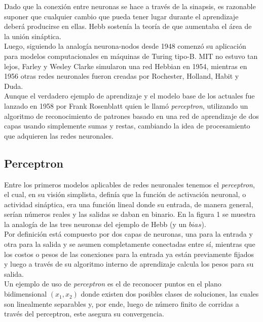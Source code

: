 \documentclass{llncs}
\begin{document}
Dado que la conexi\'on entre neuronas se hace a trav\'es de la sinapsis, es razonable suponer que cualquier cambio que pueda tener
lugar durante el aprendizaje deber\'a producirse en ellas. Hebb sosten\'ia la teor\'ia de que aumentaba el \'area de la uni\'on sin\'aptica.\\

Luego, siguiendo la analog\'ia neurona-nodos desde 1948 comenz\'o su aplicaci\'on para modelos
computacionales en m\'aquinas de Turing tipo-B. MIT no estuvo tan lejos, Farley y Wesley Clarke simularon una red Hebbian en 1954,
mientras en 1956 otras redes neuronales fueron creadas por Rochester, Holland, Habit y Duda. \\

Aunque el verdadero ejemplo de aprendizaje y el modelo base de los actuales fue lanzado en 1958 por Frank Rosenblatt quien le llam\'o
\textit{perceptron}, utilizando un algoritmo de reconocimiento de patrones basado en una red de aprendizaje de dos capas usando
simplemente sumas y restas, cambiando la idea de procesamiento que adquieren las redes neuronales.

\subsection{Perceptron}



Entre los primeros modelos aplicables de redes neuronales tenemos el \textit{perceptron}, el cual, en su visi\'on simplista, defin\'ia que
la funci\'on de activaci\'on neuronal, o actividad sin\'aptica, era una funci\'on lineal donde su entrada, de manera general, ser\'ian n\'umeros
reales y las salidas se daban en binario. En la figura 1 se muestra la analog\'ia de las tres neuronas del ejemplo de Hebb (y un $bias$).\\

Por definici\'on est\'a compuesto por dos capas de neuronas, una para la entrada y otra para la salida y se asumen completamente conectadas
entre s\'i, mientras que los costos o pesos de las conexiones para la entrada ya est\'an previamente fijados y luego a trav\'es de su algoritmo
interno de aprendizaje calcula los pesos para su salida. \\


Un ejemplo de uso de \textit{perceptron} es el de reconocer puntos en el plano bidimensional $(x_1, x_2)$ donde existen dos posibles clases de soluciones,
las cuales son linealmente separables y, por ende, luego de n\'umero finito de corridas a trav\'es del perceptron, este asegura su convergencia. \\
\end{document}
